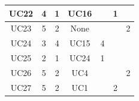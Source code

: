 \documentclass[12pt]{article}
\begin{document}
\begin{longtable}{|c|ccc|l|l|l|}
		UC22                 & \multicolumn{1}{c|}{4}               & \multicolumn{1}{c|}{1}                                                                         & UC16               &                                                                                            & \multicolumn{1}{c|}{1}                                                                        &                                                                                            \\ \hline
		UC23                 & \multicolumn{1}{c|}{5}               & \multicolumn{1}{c|}{2}                                                                         & None               &                                                                                            &                                                                                               & \multicolumn{1}{c|}{2}                                                                     \\ \hline
		UC24                 & \multicolumn{1}{c|}{3}               & \multicolumn{1}{c|}{4}                                                                         & UC15               & \multicolumn{1}{c|}{4}                                                                     &                                                                                               &                                                                                            \\ \hline
		UC25                 & \multicolumn{1}{c|}{2}               & \multicolumn{1}{c|}{1}                                                                         & UC24               & \multicolumn{1}{c|}{1}                                                                     &                                                                                               &                                                                                            \\ \hline
		UC26                 & \multicolumn{1}{c|}{5}               & \multicolumn{1}{c|}{2}                                                                         & UC4                &                                                                                            &                                                                                               & \multicolumn{1}{c|}{2}                                                                     \\ \hline
		UC27                 & \multicolumn{1}{c|}{5}               & \multicolumn{1}{c|}{2}                                                                         & UC1                &                                                                                            & \multicolumn{1}{c|}{2}                                                                        &                                                                                            \\ \hline

\end{longtable}
\end{document}
